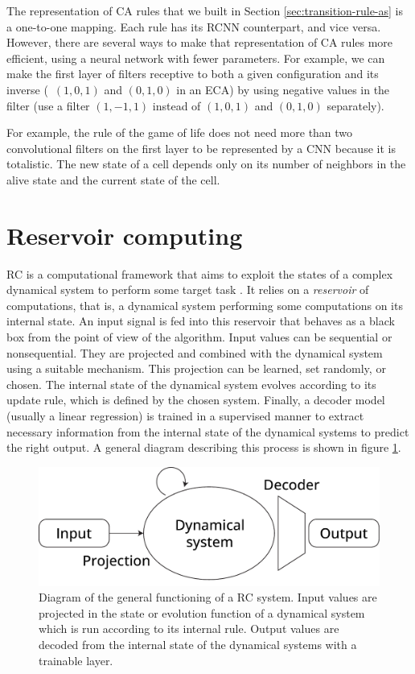 The representation of \ac{CA} rules that we built in Section
\ref{sec:transition-rule-as} is a one-to-one mapping. Each rule has its
R\ac{CNN} counterpart, and vice versa. However, there are several ways to make
that representation of \ac{CA} rules more efficient, using a neural network with
fewer parameters. For example, we can make the first layer of filters receptive
to both a given configuration and its inverse (\eg~$(1, 0, 1)$ and $(0, 1, 0)$
in an \acl{ECA}) by using negative values in the filter (use a filter $(1, -1, 1)$
instead of $(1, 0, 1)$ and $(0, 1, 0)$ separately).

For example, the rule of the game of life does not need more than two convolutional
filters on the first layer to be represented by a \ac{CNN} because it is
totalistic. The new state of a cell depends only on its number of neighbors in
the alive state and the current state of the cell.


\section{Reservoir computing \label{sec:res-models}}
\Acf{RC} is a computational framework that aims to exploit the states of a
complex dynamical system to perform some target task
\parencite{tanakaRecentAdvancesPhysical2019}. It relies on a \emph{reservoir} of
computations, that is, a dynamical system performing some computations on its
internal state. An input signal is fed into this reservoir that behaves as a
black box from the point of view of the algorithm. Input values can be
sequential or nonsequential. They are projected and combined with the dynamical
system using a suitable mechanism. This projection can be learned, set randomly,
or chosen. The internal state of the dynamical system evolves according to its
update rule, which is defined by the chosen system. Finally, a decoder model
(usually a linear regression) is trained in a supervised manner to extract
necessary information from the internal state of the dynamical systems to
predict the right output. A general diagram describing this process is shown in
figure \ref{fig:reservoir_diagram}.

\begin{figure}[htbp]
  \centering
  \includegraphics[width=.8\linewidth]{figures/reservoir_schema}
  \caption{Diagram of the general functioning of a \acf{RC} system. Input values
    are projected in the state or evolution function of a dynamical system which
    is run according to its internal rule. Output values are decoded from the
    internal state of the dynamical systems with a trainable layer.}
  \label{fig:reservoir_diagram}
\end{figure}

